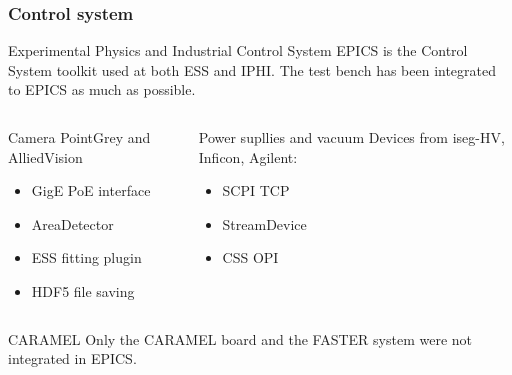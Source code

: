 \begin{frame}[t]
  \frametitle{Control system}
  \begin{block}{Experimental Physics and Industrial Control System}
    EPICS is the Control System toolkit used at both ESS and IPHI. The test bench has been integrated to EPICS as much as possible.
  \end{block}

  \begin{columns}[T]
    \begin{column}{0.45\textwidth}
      \begin{block}{Camera}
        PointGrey and AlliedVision
        \begin{itemize}
          \item GigE PoE interface
          \item AreaDetector
          \item ESS fitting plugin
          \item HDF5 file saving
        \end{itemize}
      \end{block}
    \end{column}

    \begin{column}{0.45\textwidth}
      \begin{block}{Power supllies and vacuum}
        Devices from iseg-HV, Inficon, Agilent:
        \begin{itemize}
          \item SCPI TCP
          \item StreamDevice
          \item CSS OPI
        \end{itemize}
      \end{block}
    \end{column}
  \end{columns}

  \begin{alertblock}{CARAMEL}
    Only the CARAMEL board and the FASTER system were not integrated in EPICS.
  \end{alertblock}
\end{frame}

